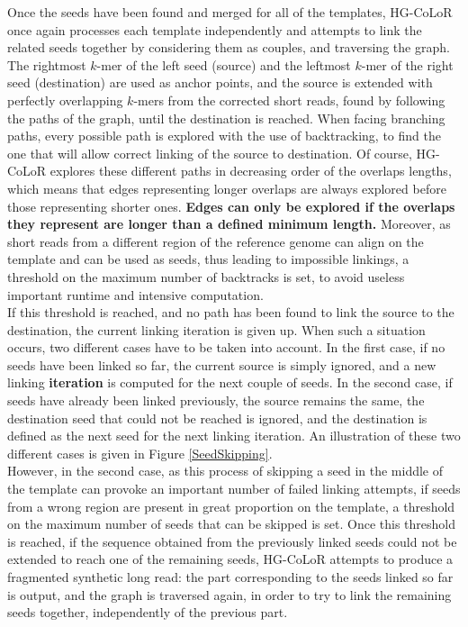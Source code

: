 \documentclass[long, final]{jobim2017}
\begin{document}
Once the seeds have been found and merged for all of the templates, HG-CoLoR once again processes each template independently and attempts to link the related seeds together by considering them as couples, and traversing the graph. The rightmost $k$-mer of the left seed (source) and the leftmost $k$-mer of the right seed (destination) are used as anchor points, and the source is extended with perfectly overlapping $k$-mers from the corrected short reads, found by following the paths of the graph, until the destination is reached. When facing branching paths, every possible path is explored with the use of backtracking, to find the one that will allow correct linking of the source to destination. Of course, HG-CoLoR explores these different paths in decreasing order of the overlaps lengths, which means that edges representing longer overlaps are always explored before those representing shorter ones. \textbf{Edges can only be explored if the overlaps they represent are longer than a defined minimum length.} Moreover, as short reads from a different region of the reference genome can align on the template and can be used as seeds, thus leading to impossible linkings, a threshold on the maximum number of backtracks is set, to avoid useless important runtime and intensive computation. \\
\indent If this threshold is reached, and no path has been found to link the source to the destination, the current linking iteration is given up. When such a situation occurs, two different cases have to be taken into account. In the first case, if no seeds have been linked so far, the current source is simply ignored, and a new linking \textbf{iteration} is computed for the next couple of seeds. In the second case, if seeds have already been linked previously, the source remains the same, the destination seed that could not be reached is ignored, and the destination is defined as the next seed for the next linking iteration. An illustration of these two different cases is given in Figure \ref{SeedSkipping}. \\
\indent However, in the second case, as this process of skipping a seed in the middle of the template can provoke an important number of failed linking attempts, if seeds from a wrong region are present in great proportion on the template, a threshold on the maximum number of seeds that can be skipped is set. 
Once this threshold is reached, if the sequence obtained from the previously linked seeds could not be extended to reach one of the remaining seeds, HG-CoLoR attempts to produce a fragmented synthetic long read: the part corresponding to the seeds linked so far is output, and the graph is traversed again, in order to try to link the remaining seeds together, independently of the previous part.
\end{document}
